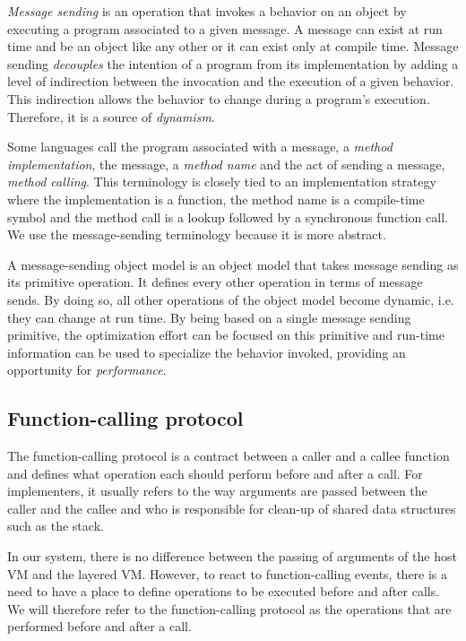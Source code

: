 \textit{Message sending} is an operation that invokes a behavior on an object by
executing a program associated to a given message.  A message can exist at run
time and be an object like any other or it can exist only at compile time.
Message sending \textit{decouples} the intention of a program from its
implementation by adding a level of indirection between the invocation and the
execution of a given behavior. This indirection allows the behavior to change
during a program's execution. Therefore, it is a source of \textit{dynamism}.

Some languages call the program associated with a message, a \textit{method
implementation}, the message, a \textit{method name} and the act of sending a
message, \textit{method calling}. This terminology is closely tied to an
implementation strategy where the implementation is a function, the method name
is a compile-time symbol and the method call is a lookup followed by a
synchronous function call. We use the message-sending terminology because it is
more abstract. 

A message-sending object model is an object model that takes message sending as
its primitive operation. It defines every other operation in terms of message
sends. By doing so, all other operations of the object model become dynamic,
i.e. they can change at run time. By being based on a single message sending
primitive, the optimization effort can be focused on this primitive and
run-time information can be used to specialize the behavior invoked, providing
an opportunity for \textit{performance}. 

\subsection{Function-calling protocol}

The function-calling protocol is a contract between a caller and a callee
function and defines what operation each should perform before and after a
call. For implementers, it usually refers to the way arguments are
passed between the caller and the callee and who is responsible for clean-up of
shared data structures such as the stack.

In our system, there is no difference between the passing of arguments of the
host VM and the layered VM. However, to react to function-calling events, there
is a need to have a place to define operations to be executed before and after
calls. We will therefore refer to the function-calling protocol as the
operations that are performed before and after a call. 

